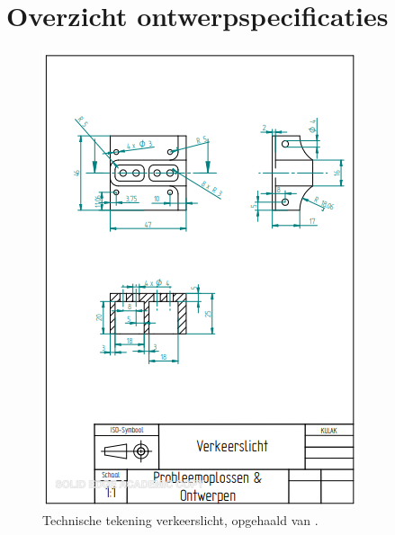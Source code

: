 \documentclass[a4paper,twoside,kulak]{kulakreport}
\begin{document}
	
	

	
	
	
	\section{Overzicht ontwerpspecificaties}
	\label{sec: ontws}

	
	\bigskip
	
	\begin{figure}
		\centering
		\includegraphics[width=.8\textwidth]{verkeerslicht}
		\caption{Technische tekening verkeerslicht, opgehaald van \cite{artikel1}. }
		\label{fig: verkeerslicht}
	\end{figure}
	\bigskip
\end{document}
